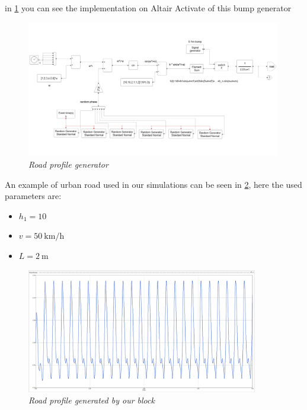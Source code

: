 \documentclass{article}
\numberwithin{equation}{section}
\numberwithin{figure}{section}
\numberwithin{table}{section}
\numberwithin{table}{section}
\begin{document}
in \cref{fig:road_generator_sch} you can see the implementation on Altair Activate of this bump generator
\begin{figure}[H]
    \centering
    \includegraphics[width=0.99\textwidth]{Pictures/road_bump_generator.png}
    \caption{\emph{Road profile generator}}
    \label{fig:road_generator_sch}
\end{figure}
An example of urban road used in our simulations can be seen in \cref{fig:road_generator_example}, here the used parameters are:
\begin{itemize}
    \item $h_1=10$
    \item $v=\SI{50}{\kilo\metre/\hour}$
    \item $L=\SI{2}{\metre}$
\end{itemize}
\begin{figure}[H]
    \centering
    \includegraphics[width=0.9\textwidth]{Pictures/random_generated_road_profile.PNG}
    \caption{\emph{Road profile generated by our block}}
    \label{fig:road_generator_example}
\end{figure}
\end{document}

